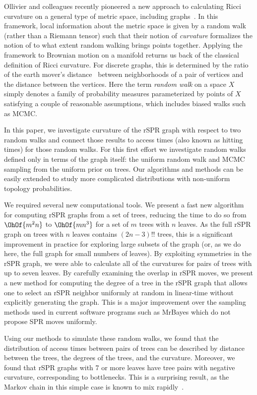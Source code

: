 \documentclass[11pt,onecolumn,conference]{IEEEtran}
\begin{document}
Ollivier and colleagues recently pioneered a new approach to calculating Ricci curvature on a general type of metric space, including graphs~\cite{Ollivier2009-bw,Joulin2010-jg}.
In this framework, local information about the metric space is given by a random walk (rather than a Riemann tensor) such that their notion of \emph{curvature} formalizes the notion of to what extent random walking brings points together.
Applying the framework to Brownian motion on a manifold returns us back of the classical definition of Ricci curvature.
For discrete graphs, this is determined by the ratio of the earth mover's distance~\cite{rubner2000earth} between neighborhoods of a pair of vertices and the distance between the vertices.
Here the term \emph{random walk} on a space $X$ simply denotes a family of probability measures parameterized by points of $X$ satisfying a couple of reasonable assumptions, which includes biased walks such as MCMC.

In this paper, we investigate curvature of the rSPR graph with respect to two random walks and connect those results to access times (also known as hitting times) for those random walks.
For this first effort we investigate random walks defined only in terms of the graph itself: the uniform random walk and MCMC sampling from the uniform prior on trees.
Our algorithms and methods can be easily extended to study more complicated distributions with non-uniform topology probabilities.

We required several new computational tools.
We present a fast new algorithm for computing rSPR graphs from a set of trees, reducing the time to do so from $\OhOf{m^2n}$ to $\OhOf{mn^3}$ for a set of $m$ trees with $n$ leaves.
As the full rSPR graph on trees with $n$ leaves contains $(2n-3)!!$ trees, this is a significant improvement in practice for exploring large subsets of the graph (or, as we do here, the full graph for small numbers of leaves).
By exploiting symmetries in the rSPR graph, we were able to calculate all of the curvatures for pairs of trees with up to seven leaves.
By carefully examining the overlap in rSPR moves, we present a new method for computing the degree of a tree in the rSPR graph that allows one to select an rSPR neighbor uniformly at random in linear-time without explicitly generating the graph.
This is a major improvement over the sampling methods used in current software programs such as MrBayes which do not propose SPR moves uniformly.

Using our methods to simulate these random walks, we found that the distribution of access times between pairs of trees can be described by distance between the trees, the degrees of the trees, and the curvature.
Moreover, we found that rSPR graphs with 7 or more leaves have tree pairs with negative curvature, corresponding to bottlenecks.
This is a surprising result, as the Markov chain in this simple case is known to mix rapidly~\cite{spade2014note}.
\end{document}
